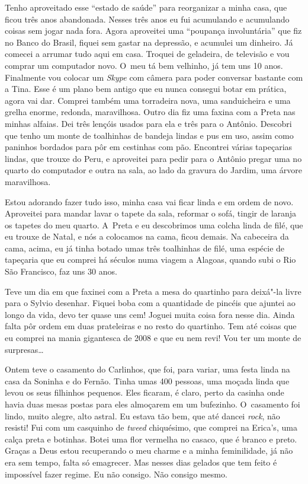 Tenho aproveitado esse ``estado de saúde'' para reorganizar a minha
casa, que ficou três anos abandonada. Nesses três anos eu fui acumulando
e acumulando coisas sem jogar nada fora. Agora aproveitei uma ``poupança
involuntária'' que fiz no Banco do Brasil, fiquei sem gastar na
depressão, e acumulei um dinheiro. Já comecei a arrumar tudo aqui em
casa. Troquei de geladeira, de televisão e vou comprar um computador
novo. O~meu tá bem velhinho, já tem uns 10 anos. Finalmente vou colocar
um \emph{Skype} com câmera para poder conversar bastante com a Tina.
Esse é um plano bem antigo que eu nunca consegui botar em prática, agora
vai dar. Comprei também uma torradeira nova, uma sanduicheira e uma
grelha enorme, redonda, maravilhosa. Outro dia fiz uma faxina com a
Preta nas minhas alfaias. Dei três lençóis usados para ela e três para o
Antônio. Descobri que tenho um monte de toalhinhas de bandeja lindas e
pus em uso, assim como paninhos bordados para pôr em cestinhas com pão.
Encontrei várias tapeçarias lindas, que trouxe do Peru, e aproveitei
para pedir para o Antônio pregar uma no quarto do computador e outra na
sala, ao lado da gravura do Jardim, uma árvore maravilhosa.

Estou adorando fazer tudo isso, minha casa vai ficar linda e em ordem de
novo. Aproveitei para mandar lavar o tapete da sala, reformar o sofá,
tingir de laranja os tapetes do meu quarto. A~Preta e eu descobrimos uma
colcha linda de filé, que eu trouxe de Natal, e nós a colocamos na cama,
ficou demais. Na cabeceira da cama, acima, eu já tinha botado umas três
toalhinhas de filé, uma espécie de tapeçaria que eu comprei há séculos
numa viagem a Alagoas, quando subi o Rio São Francisco, faz uns 30 anos.

Teve um dia em que faxinei com a Preta a mesa do quartinho para deixá"-la
livre para o Sylvio desenhar. Fiquei boba com a quantidade de pincéis
que ajuntei ao longo da vida, devo ter quase uns cem! Joguei muita coisa
fora nesse dia. Ainda falta pôr ordem em duas prateleiras e no resto do
quartinho. Tem até coisas que eu comprei na mania gigantesca de 2008 e
que eu nem revi! Vou ter um monte de surpresas…

Ontem teve o casamento do Carlinhos, que foi, para variar, uma festa
linda na casa da Soninha e do Fernão. Tinha umas 400 pessoas, uma moçada
linda que levou os seus filhinhos pequenos. Eles ficaram, é claro, perto
da casinha onde havia duas mesas postas para eles almoçarem em um
bufezinho. O~casamento foi lindo, muito alegre, alto astral. Eu estava
tão bem, que até dancei \emph{rock}, não resisti! Fui com um casquinho
de \emph{tweed} chiquésimo, que comprei na Erica's, uma calça preta e
botinhas. Botei uma flor vermelha no casaco, que é branco e preto.
Graças a Deus estou recuperando o meu charme e a minha feminilidade, já
não era sem tempo, falta só emagrecer. Mas nesses dias gelados que tem
feito é impossível fazer regime. Eu não consigo. Não consigo mesmo.

